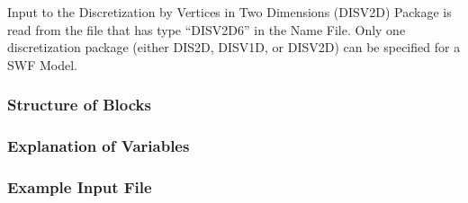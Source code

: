 Input to the Discretization by Vertices in Two Dimensions (DISV2D) Package is read from the file that has type ``DISV2D6'' in the Name File.  Only one discretization package (either DIS2D, DISV1D, or DISV2D) can be specified for a SWF Model.

\vspace{5mm}
\subsubsection{Structure of Blocks}






\vspace{5mm}
\subsubsection{Explanation of Variables}
\begin{description}

\end{description}

\vspace{5mm}
\subsubsection{Example Input File}

